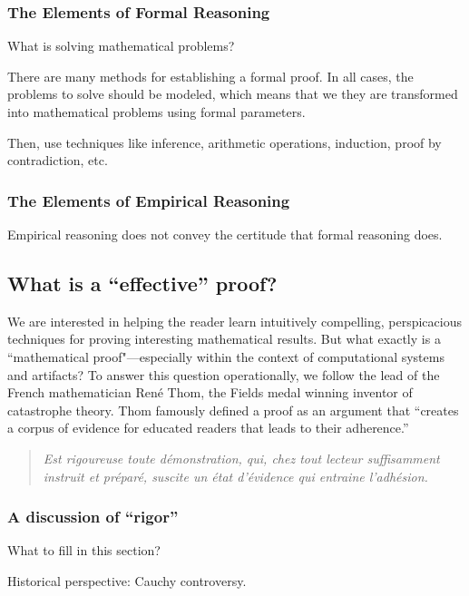 \subsubsection{The Elements of Formal Reasoning}

What is solving mathematical problems?

There are many methods for establishing a formal proof.
In all cases, the problems to solve should be modeled, which means that we 
they are transformed into mathematical problems using formal parameters. 

Then, use techniques like inference, arithmetic operations, induction,
proof by contradiction, etc.

\subsubsection{The Elements of Empirical Reasoning}

Empirical reasoning does not convey the certitude that formal
reasoning does.  


\subsection{What is a ``effective'' proof?}

We are interested in helping the reader learn intuitively compelling,
perspicacious techniques for proving interesting mathematical results.
But what exactly is a ``mathematical proof"---especially within the
context of computational systems and artifacts?  To answer this
question operationally, we follow the lead of the French mathematician
Ren\'e Thom,  the Fields medal winning inventor
of catastrophe theory.  Thom famously defined a proof as an argument
that ``creates a corpus of evidence for educated readers that leads
to their adherence.''
\begin{quote}
{\em Est rigoureuse toute d\'{e}monstration, qui, chez tout lecteur
  suffisamment instruit et pr\'{e}par\'{e}, suscite un \'{e}tat
  d'\'{e}vidence qui entraine l'adh\'{e}sion.}
\end{quote}


\subsubsection{A discussion of ``rigor''}

What to fill in this section?

Historical perspective: Cauchy controversy.

